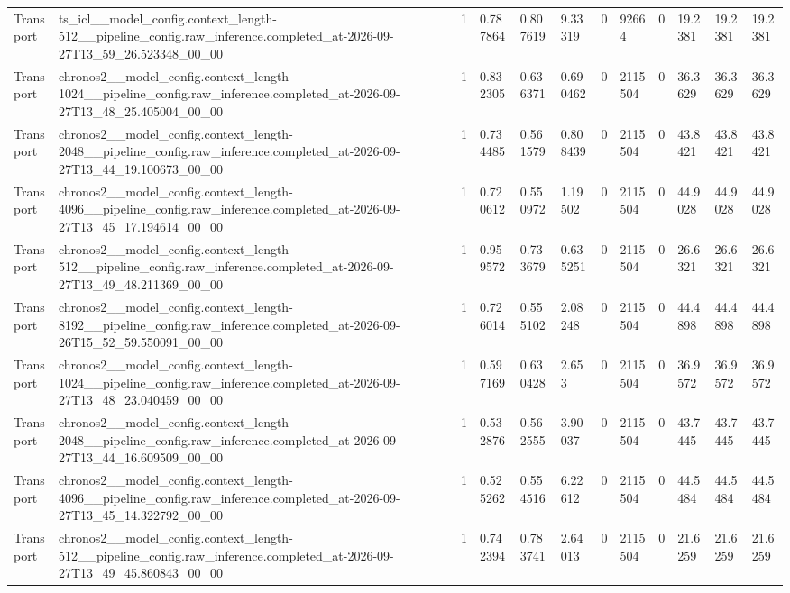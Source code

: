 \begin{tabular}{llllllllllll}
Transport & ts\_icl\_\_model\_config.context\_length-512\_\_pipeline\_config.raw\_inference.completed\_at-2026-09-27T13\_59\_26.523348\_00\_00 & 1 & 0.787864 & 0.807619 & 9.33319 & 0 & 92664 & 0 & 19.2381 & 19.2381 & 19.2381 \\
Transport & chronos2\_\_model\_config.context\_length-1024\_\_pipeline\_config.raw\_inference.completed\_at-2026-09-27T13\_48\_25.405004\_00\_00 & 1 & 0.832305 & 0.636371 & 0.690462 & 0 & 2115504 & 0 & 36.3629 & 36.3629 & 36.3629 \\
Transport & chronos2\_\_model\_config.context\_length-2048\_\_pipeline\_config.raw\_inference.completed\_at-2026-09-27T13\_44\_19.100673\_00\_00 & 1 & 0.734485 & 0.561579 & 0.808439 & 0 & 2115504 & 0 & 43.8421 & 43.8421 & 43.8421 \\
Transport & chronos2\_\_model\_config.context\_length-4096\_\_pipeline\_config.raw\_inference.completed\_at-2026-09-27T13\_45\_17.194614\_00\_00 & 1 & 0.720612 & 0.550972 & 1.19502 & 0 & 2115504 & 0 & 44.9028 & 44.9028 & 44.9028 \\
Transport & chronos2\_\_model\_config.context\_length-512\_\_pipeline\_config.raw\_inference.completed\_at-2026-09-27T13\_49\_48.211369\_00\_00 & 1 & 0.959572 & 0.733679 & 0.635251 & 0 & 2115504 & 0 & 26.6321 & 26.6321 & 26.6321 \\
Transport & chronos2\_\_model\_config.context\_length-8192\_\_pipeline\_config.raw\_inference.completed\_at-2026-09-26T15\_52\_59.550091\_00\_00 & 1 & 0.726014 & 0.555102 & 2.08248 & 0 & 2115504 & 0 & 44.4898 & 44.4898 & 44.4898 \\
Transport & chronos2\_\_model\_config.context\_length-1024\_\_pipeline\_config.raw\_inference.completed\_at-2026-09-27T13\_48\_23.040459\_00\_00 & 1 & 0.597169 & 0.630428 & 2.653 & 0 & 2115504 & 0 & 36.9572 & 36.9572 & 36.9572 \\
Transport & chronos2\_\_model\_config.context\_length-2048\_\_pipeline\_config.raw\_inference.completed\_at-2026-09-27T13\_44\_16.609509\_00\_00 & 1 & 0.532876 & 0.562555 & 3.90037 & 0 & 2115504 & 0 & 43.7445 & 43.7445 & 43.7445 \\
Transport & chronos2\_\_model\_config.context\_length-4096\_\_pipeline\_config.raw\_inference.completed\_at-2026-09-27T13\_45\_14.322792\_00\_00 & 1 & 0.525262 & 0.554516 & 6.22612 & 0 & 2115504 & 0 & 44.5484 & 44.5484 & 44.5484 \\
Transport & chronos2\_\_model\_config.context\_length-512\_\_pipeline\_config.raw\_inference.completed\_at-2026-09-27T13\_49\_45.860843\_00\_00 & 1 & 0.742394 & 0.783741 & 2.64013 & 0 & 2115504 & 0 & 21.6259 & 21.6259 & 21.6259 \\

\end{tabular}
